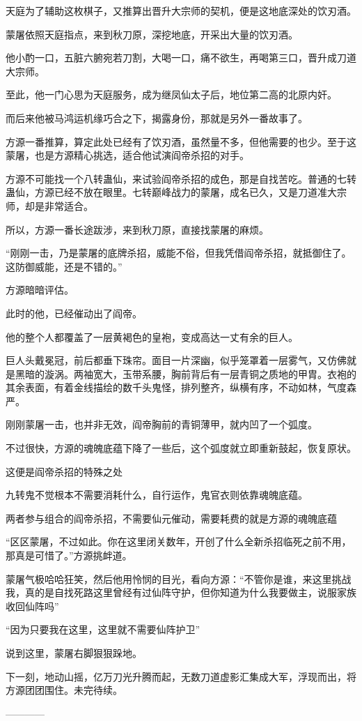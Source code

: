 \begin{this_body}
天庭为了辅助这枚棋子，又推算出晋升大宗师的契机，便是这地底深处的饮刃酒。

蒙屠依照天庭指点，来到秋刀原，深挖地底，开采出大量的饮刃酒。

他小酌一口，五脏六腑宛若刀割，大喝一口，痛不欲生，再喝第三口，晋升成刀道大宗师。

至此，他一门心思为天庭服务，成为继凤仙太子后，地位第二高的北原内奸。

而后来他被马鸿运机缘巧合之下，揭露身份，那就是另外一番故事了。

方源一番推算，算定此处已经有了饮刃酒，虽然量不多，但他需要的也少。至于这蒙屠，也是方源精心挑选，适合他试演阎帝杀招的对手。

方源不可能找一个八转蛊仙，来试验阎帝杀招的成色，那是自找苦吃。普通的七转蛊仙，方源已经不放在眼里。七转巅峰战力的蒙屠，成名已久，又是刀道准大宗师，却是非常适合。

所以，方源一番长途跋涉，来到秋刀原，直接找蒙屠的麻烦。

“刚刚一击，乃是蒙屠的底牌杀招，威能不俗，但我凭借阎帝杀招，就抵御住了。这防御威能，还是不错的。”

方源暗暗评估。

此时的他，已经催动出了阎帝。

他的整个人都覆盖了一层黄褐色的皇袍，变成高达一丈有余的巨人。

巨人头戴冕冠，前后都垂下珠帘。面目一片深幽，似乎笼罩着一层雾气，又仿佛就是黑暗的漩涡。两袖宽大，玉带系腰，胸前背后有一层青铜之质地的甲胄。衣袍的其余表面，有着金线描绘的数千头鬼怪，排列整齐，纵横有序，不动如林，气度森严。

刚刚蒙屠一击，也并非无效，阎帝胸前的青铜薄甲，就内凹了一个弧度。

不过很快，方源的魂魄底蕴下降了一些后，这个弧度就立即重新鼓起，恢复原状。

这便是阎帝杀招的特殊之处

九转鬼不觉根本不需要消耗什么，自行运作，鬼官衣则依靠魂魄底蕴。

两者参与组合的阎帝杀招，不需要仙元催动，需要耗费的就是方源的魂魄底蕴

“区区蒙屠，不过如此。你在这里闭关数年，开创了什么全新杀招临死之前不用，那真是可惜了。”方源挑衅道。

蒙屠气极哈哈狂笑，然后他用怜悯的目光，看向方源：“不管你是谁，来这里挑战我，真的是自找死路这里曾经有过仙阵守护，但你知道为什么我要做主，说服家族收回仙阵吗”

“因为只要我在这里，这里就不需要仙阵护卫”

说到这里，蒙屠右脚狠狠跺地。

下一刻，地动山摇，亿万刀光升腾而起，无数刀道虚影汇集成大军，浮现而出，将方源团团围住。未完待续。

------------

\end{this_body}

